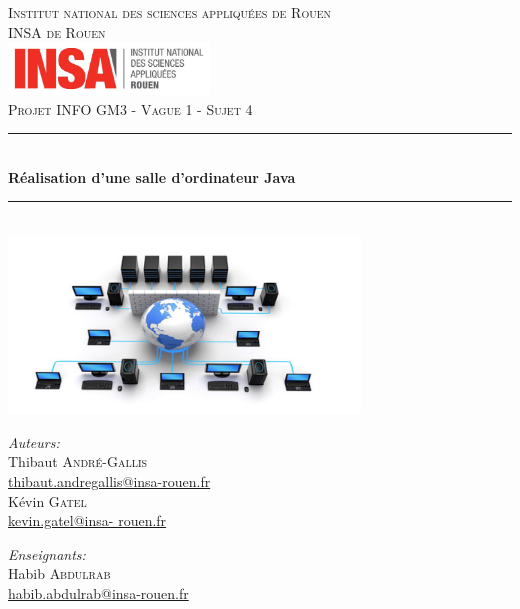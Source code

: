 \documentclass[12,french]{report}
\newcommand{\HRule}{\rule{\linewidth}{0.5mm}}
\begin{document}
\hypersetup{pdfborder=0 0 0}

\begin{titlepage}

\begin{center}
	\textsc{{\LARGE Institut national des sciences appliquées de Rouen} \\ 			\vspace{6mm} {\Large INSA de Rouen}} \\
	\vspace{5mm}
	\includegraphics[width=0.4\textwidth]{./Images/insa}\\[1.0 cm]

	\textsc{\Large Projet INFO GM3 - Vague 1 - Sujet 4}\\[0.6cm]

	\HRule \\[0.5cm]
	{ \Huge \bfseries Réalisation d'une salle d'ordinateur Java}\\[0.2cm]
	\HRule \\[0.75cm]

	\includegraphics[width=0.7\textwidth]{./Images/pagedegarde}\\[0.9 cm]

	\begin{minipage}{0.4\textwidth}
		\begin{flushleft} \large
			\emph{Auteurs:}\\
			Thibaut \textsc{André-Gallis} \\
			{\small\href{mailto:thibaut.andregallis@insa-rouen.fr}{thibaut.andregallis@insa-rouen.fr}} \\
			Kévin \textsc{Gatel} \\
			{\small\href{mailto:kevin.gatel@insa-rouen.fr}{kevin.gatel@insa-				rouen.fr}}
		\end{flushleft}
	\end{minipage}
	\begin{minipage}{0.4\textwidth}
		\begin{flushright} \large
			\emph{Enseignants:} \\
			Habib \textsc{Abdulrab} \\
			{\small\href{mailto:habib.abdulrab@insa-rouen.fr}{habib.abdulrab@insa-rouen.fr}}
		\end{flushright}
	\end{minipage}


\end{center}
\end{titlepage}
\end{document}
